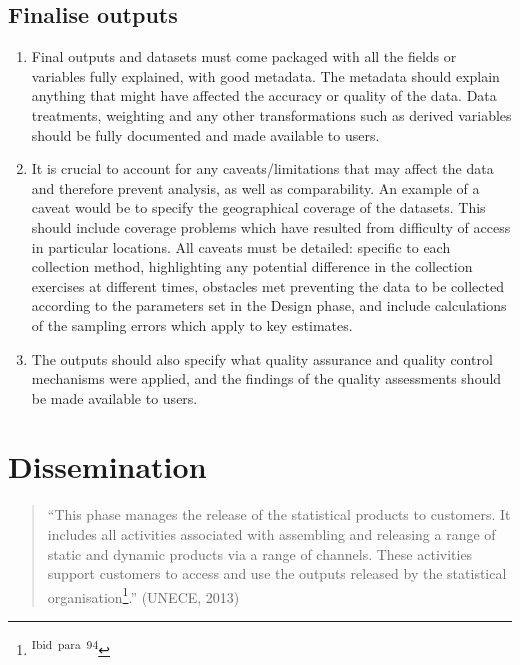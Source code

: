 \documentclass[
]{article}
\begin{document}
\hypertarget{finalise-outputs-1}{%
\subsection{Finalise outputs}\label{finalise-outputs-1}}

\begin{enumerate}
\def\labelenumi{\arabic{enumi}.}
\setcounter{enumi}{482}
\item
  Final outputs and datasets must come packaged with all the fields
  or variables fully explained, with good metadata. The metadata
  should explain anything that might have affected the accuracy or
  quality of the data. Data treatments, weighting and any other
  transformations such as derived variables should be fully documented
  and made available to users.
\item
  It is crucial to account for any caveats/limitations that may
  affect the data and therefore prevent analysis, as well as
  comparability. An example of a caveat would be to specify the
  geographical coverage of the datasets. This should include coverage
  problems which have resulted from difficulty of access in particular
  locations. All caveats must be detailed: specific to each collection
  method, highlighting any potential difference in the collection
  exercises at different times, obstacles met preventing the data to
  be collected according to the parameters set in the Design phase,
  and include calculations of the sampling errors which apply to key
  estimates.
\item
  The outputs should also specify what quality assurance and quality
  control mechanisms were applied, and the findings of the quality
  assessments should be made available to users.
\end{enumerate}

\hypertarget{dissemination-1}{%
\section{Dissemination}\label{dissemination-1}}

\begin{quote}
``This phase manages the release of the statistical products to
customers. It includes all activities associated with assembling and
releasing a range of static and dynamic products via a range of
channels. These activities support customers to access and use the
outputs released by the statistical organisation\footnote{\textsuperscript{Ibid~para~94}}.'' (UNECE, 2013)
\end{quote}
\end{document}
